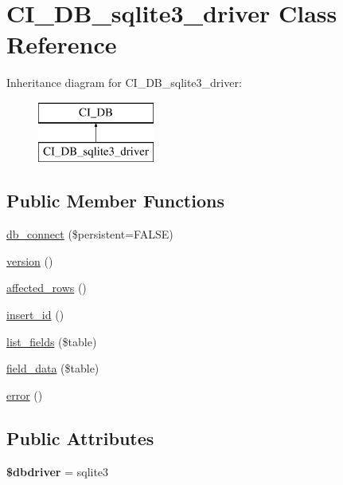 \hypertarget{class_c_i___d_b__sqlite3__driver}{}\section{C\+I\+\_\+\+D\+B\+\_\+sqlite3\+\_\+driver Class Reference}
\label{class_c_i___d_b__sqlite3__driver}
Inheritance diagram for C\+I\+\_\+\+D\+B\+\_\+sqlite3\+\_\+driver\+:\begin{figure}[H]
\begin{center}
\leavevmode
\includegraphics[height=2.000000cm]{class_c_i___d_b__sqlite3__driver}
\end{center}
\end{figure}
\subsection*{Public Member Functions}
\begin{DoxyCompactItemize}
\item 
\mbox{\hyperlink{class_c_i___d_b__sqlite3__driver_a0d28ddaa657330aac6829b4ae7415f2b}{db\+\_\+connect}} (\$persistent=F\+A\+L\+SE)
\item 
\mbox{\hyperlink{class_c_i___d_b__sqlite3__driver_a51192c547746f00de4da54cc925bc1ab}{version}} ()
\item 
\mbox{\hyperlink{class_c_i___d_b__sqlite3__driver_a779ce0845aaaa2e1cf53f0834359fcd3}{affected\+\_\+rows}} ()
\item 
\mbox{\hyperlink{class_c_i___d_b__sqlite3__driver_a922e8ed0bb0d34f1ee89d44158855cf5}{insert\+\_\+id}} ()
\item 
\mbox{\hyperlink{class_c_i___d_b__sqlite3__driver_ac5937e24046400d6950e0a73a3eff788}{list\+\_\+fields}} (\$table)
\item 
\mbox{\hyperlink{class_c_i___d_b__sqlite3__driver_aa31e69f3a33b87289eb4a6eacc52ff44}{field\+\_\+data}} (\$table)
\item 
\mbox{\hyperlink{class_c_i___d_b__sqlite3__driver_aa25971bd22dde08ce3a7ad1c4537b746}{error}} ()
\end{DoxyCompactItemize}
\subsection*{Public Attributes}
\begin{DoxyCompactItemize}
\item 
\mbox{\label{class_c_i___d_b__sqlite3__driver_a0c634959fb05e4f5c41626e8ad9dd67d}} 
{\bfseries \$dbdriver} = \textquotesingle{}sqlite3\textquotesingle{}
\end{DoxyCompactItemize}
